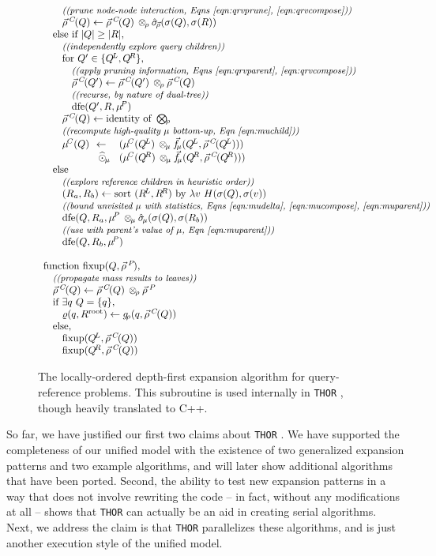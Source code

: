 \documentclass[twoside,leqno,twocolumn]{article}
\newcommand{\THOR}{{{\tt THOR}} }
\newcommand{\com}[1]{{\small \textit{((#1))}}}
\newcommand{\summary}{\hat{\sigma}}
\newcommand{\psty}{}
\newcommand{\X}{\\ \psty}
\newcommand{\x}{\X \hspace{0.13in}}
\newcommand{\xx}{\X \hspace{0.26in}}
\newcommand{\xxx}{\X \hspace{0.39in}}
\newcommand{\kdroot}[1]{#1^{\text{root}}}
\newcommand{\kdleft}[1]{#1^{\!L}}
\newcommand{\kdright}[1]{#1^{\!R}}
\newcommand{\nameOp}[2]{\mathop{#1\nolimits\!\!_{#2}}}
\newcommand{\nameop}[2]{{\scriptstyle\:}#1_{\!#2}}
\newcommand{\myOp}[1]{\nameOp{\bigotimes}{#1}}
\newcommand{\myop}[1]{\nameop{\otimes}{#1}}
\newcommand{\letterqr}{\rho}
\newcommand{\outqr}{\varrho}
\newcommand{\Opqr}{\myOp{\letterqr}}
\newcommand{\opqr}{\myop{\letterqr}}
\newcommand{\gqr}{g_{\!\letterqr}}
\newcommand{\letterqrv}{\vec{\rho}}
\newcommand{\deltaqrv}{\summary_{\!\letterqrv}}
\newcommand{\varqrv}{\letterqrv^{\:C\!}}
\newcommand{\varqrvparent}{\letterqrv^{\:P\!}}
\newcommand{\lettermu}{\mu}
\newcommand{\outopmu}{\:\widehat{\odot}_{\!\mu}\:}
\newcommand{\opmu}{\myop{\lettermu}}
\newcommand{\fmuv}{\vec{f_{\!\lettermu}}}
\newcommand{\deltamu}{\summary_{\!\lettermu}}
\newcommand{\heurqr}{H}
\newcommand{\varmuchild}{\lettermu^{\!C}}
\newcommand{\varmuparent}{\lettermu^{\!P}}
\newcommand{\outstat}{\sigma}
\begin{document}
\begin{figure}
\[\begin{array}[t]{l}
    \xx \text{\com{prune node-node interaction, Eqns \ref{eqn:qrvprune}, \ref{eqn:qrvcompose}}}
    \xx \varqrv(Q) \gets \varqrv(Q) \opqr \deltaqrv(\outstat(Q), \outstat(R))
    \x \text{else if } |Q| \geq |R|\text{,}
    \xx \text{\com{independently explore query children}}
    \xx \text{for } Q' \in \{\kdleft{Q}, \kdright{Q}\}\text{,}
    \xxx \text{\com{apply pruning information, Eqns \ref{eqn:qrvparent}, \ref{eqn:qrvcompose}}}
    \xxx \varqrv(Q') \gets \varqrv(Q') \opqr \varqrv(Q)
    \xxx \text{\com{recurse, by nature of dual-tree}}
    \xxx \text{dfe}(Q', R, \varmuparent)
    \xx \varqrv(Q) \gets \text{identity of }\Opqr
    \xx \text{\com{recompute high-quality $\lettermu$ bottom-up, Eqn~\ref{eqn:muchild}}}
    \xx \!\!\!\begin{array}{lll}
         \psty \varmuchild(Q) &\psty\!\!\gets\!\!&\psty (\varmuchild(\kdleft{Q})  \opmu \fmuv(\kdleft{Q}, \varqrv(\kdleft{Q})))
         \\          &\psty\!\!\outopmu\!\!&\psty (\varmuchild(\kdright{Q}) \opmu \fmuv(\kdright{Q}, \varqrv(\kdright{Q})))
        \end{array}
    \x \text{else}
    \xx \text{\com{explore reference children in heuristic order}}
    \xx (R_a, R_b) \gets \text{sort }(\kdleft{R}, \kdright{R})\text{ by }\lambda v ~ \heurqr(\outstat(Q), \outstat(v))
    \xx \text{\com{bound unvisited $\lettermu$ with statistics, Eqns \ref{eqn:mudelta}, \ref{eqn:mucompose}, \ref{eqn:muparent}}}
    \xx \text{dfe}(Q, R_a, \varmuparent \opmu \deltamu(\outstat(Q), \outstat(R_b))
    \xx \text{\com{use with parent's value of $\lettermu$, Eqn \ref{eqn:muparent}}}
    \xx \text{dfe}(Q, R_b, \varmuparent)
    \X
    \X \text{function fixup}(Q, \varqrvparent)\text{,}
    \x \text{\com{propagate mass results to leaves}}
    \x \varqrv(Q) \gets \varqrv(Q) \opqr \varqrvparent
    \x \text{if } \exists q ~ Q = \{q\}\text{,}
    \xx \outqr(q, \kdroot{R}) \gets \gqr(q, \varqrv(Q))
    \x \text{else,}
    \xx \text{fixup}(\kdleft{Q}, \varqrv(Q))
    \xx \text{fixup}(\kdright{Q}, \varqrv(Q))
  \end{array}
\]
\caption{\label{fig:dfe} The locally-ordered depth-first expansion algorithm for query-reference problems.
This subroutine is used internally in \THOR, though heavily translated to C++.
}
\end{figure}

So far, we have justified our first two claims about \THOR.
We have supported the completeness of our unified model with the existence of two generalized expansion patterns and two example algorithms, and will later show additional algorithms that have been ported.
Second, the ability to test new expansion patterns in a way that does not involve rewriting the code -- in fact, without any modifications at all -- shows that \THOR can actually be an aid in creating serial algorithms.
Next, we address the claim is that \THOR parallelizes these algorithms, and is just another execution style of the unified model.
\end{document}
